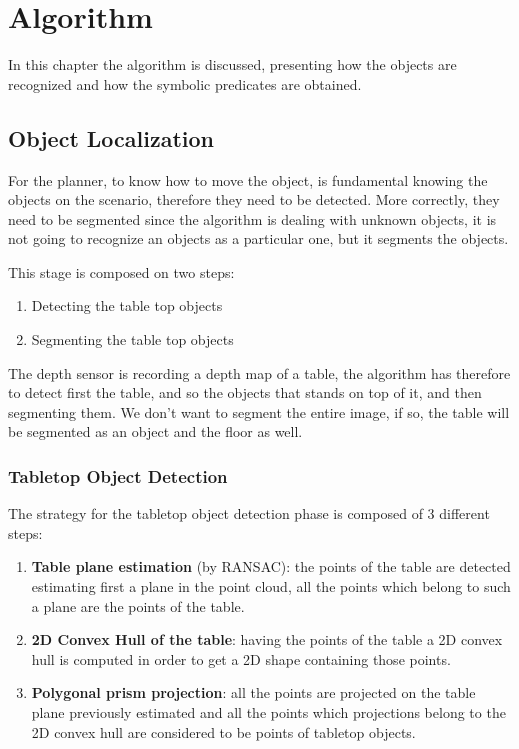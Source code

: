 \chapter{Algorithm}
\label{ch:algorithm}

In this chapter the algorithm is discussed, presenting how the objects are recognized and how the symbolic predicates are obtained. 

\section{Object Localization} 
For the planner, to know how to move the object, is fundamental knowing the objects on the scenario, therefore they need to be detected. More correctly, they need to be segmented since the algorithm is dealing with unknown objects, it is not going to recognize an objects as a particular one, but it segments the objects. 

This stage is composed on two steps:
\begin{enumerate}
\item Detecting the table top objects
\item Segmenting the table top objects
\end{enumerate}
The depth sensor is recording a depth map of a table, the algorithm has therefore to detect first the table, and so the objects that stands on top of it, and then segmenting them. We don't want to segment the entire image, if so, the table will be segmented as an object and the floor as well.

\subsection{Tabletop Object Detection} 
The strategy for the tabletop object detection phase is composed of 3 different steps:
\begin{enumerate}
\item \textbf{Table plane estimation} (by RANSAC): the points of the table are detected estimating first a plane in the point cloud, all the points which belong to such a plane are the points of the table. 
\item \textbf{2D Convex Hull of the table}: having the points of the table a 2D convex hull is computed in order to get a 2D shape containing those points.
\item \textbf{Polygonal prism projection}: all the points are projected on the table plane previously estimated and all the points which projections belong to the 2D convex hull are considered to be points of tabletop objects. 
\end{enumerate}


